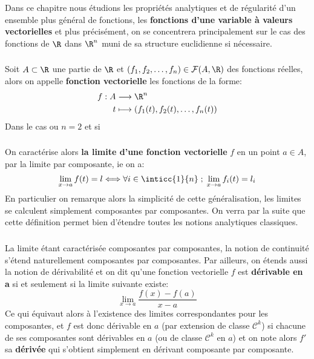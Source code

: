 \chapter*{} %

Dans ce chapitre nous étudions les propriétés analytiques et de régularité d'un ensemble plus général de fonctions, les \textbf{fonctions d'une variable à valeurs vectorielles} et plus précisément, on se concentrera principalement sur le cas des fonctions de \(\R\) dans \(\R^n\) muni de sa structure euclidienne si nécessaire.
\subsection*{}
Soit \(A \subset \R\) une partie de \(\R\) et \((f_1, f_2, \ldots, f_n)  \in \mathcal{F}(A, \R)\) des fonctions réelles, alors on appelle \textbf{fonction vectorielle} les fonctions de la forme:
\[
   \begin{aligned}
      f: A &\longrightarrow \R^n\\
      t &\longmapsto (f_1(t), f_2(t), \ldots, f_n(t))
   \end{aligned}
\]
Dans le cas ou \(n = 2\) et si \(\)
\subsection*{}
On caractérise alors \textbf{la limite d'une fonction vectorielle} \(f\) en un point \(a \in A\), par la limite par composante, ie on a:
\[
   \lim_{x \rightarrow a} f(t) = l \Longleftrightarrow \forall i \in \inticc{1}{n} \; ; \; \lim_{x \rightarrow a} f_i(t) = l_i  
\]
En particulier on remarque alors la simplicité de cette généralisation, les limites se calculent simplement composantes par composantes. On verra par la suite que cette définition permet bien d'étendre toutes les notions analytiques classiques.
\subsection*{}
La limite étant caractérisée composantes par composantes, la notion de continuité s'étend naturellement composantes par composantes. Par ailleurs, on étends aussi la notion de dérivabilité et on dit qu'une fonction vectorielle \(f\) est \textbf{dérivable en a} si et seulement si la limite suivante existe:
\[
   \lim_{x \rightarrow a} \frac{f(x) - f(a)}{x - a}
\]
Ce qui équivaut alors à l'existence des limites correspondantes pour les composantes, et \(f\) est donc dérivable en \(a\) (par extension de classe \(\mathcal{C}^k\)) si chacune de ses composantes sont dérivables en \(a\) (ou de classe \(\mathcal{C}^k\) en \(a\)) et on note alors \(f'\) sa \textbf{dérivée} qui s'obtient simplement en dérivant composante par composante.\<


